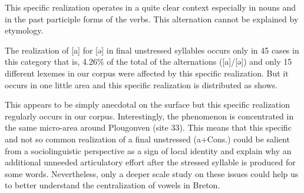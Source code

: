 \documentclass[output=paper]{LSP/langsci}
\begin{document}
This specific realization operates in a quite clear context especially in nouns and in the past participle forms of the verbs. This alternation cannot be explained by etymology. 

The realization of [a] for [ə] in final unstressed syllables occurs only in 45 cases in this category that is, 4.26\% of the total of the alternations ([a]/[ə]) and only 15 different lexemes in our corpus were affected by this specific realization. But it occurs in one little area and this specific realization is distributed as  shows.

\begin{table}
\caption{Distribution of the different occurrences of (a+Cons.) according to the location investigated}
\label{tab:brun:7}
\end{table}

This appears to be simply anecdotal on the surface but this specific realization regularly occurs in our corpus. Interestingly, the phenomenon is concentrated in the same micro-area around Plougonven (site 33). This means that this specific and not so common realization of a final unstressed (a+Cons.) could be salient from a sociolinguistic perspective as a sign of local identity and explain why an additional unneeded articulatory effort after the stressed syllable is produced for some words. Nevertheless, only a deeper scale study on these issues could help us to better understand the centralization of vowels in Breton.
\end{document}
